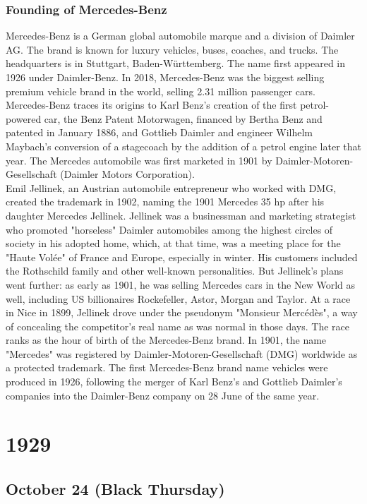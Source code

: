 \documentclass[11pt]{report}
\begin{document}
\subsection{Founding of Mercedes-Benz}
Mercedes-Benz is a German global automobile marque and a division of Daimler AG. The brand is known for luxury vehicles, buses, coaches, and trucks. The headquarters is in Stuttgart, Baden-Württemberg. The name first appeared in 1926 under Daimler-Benz. In 2018, Mercedes-Benz was the biggest selling premium vehicle brand in the world, selling 2.31 million passenger cars.\\ \indent Mercedes-Benz traces its origins to Karl Benz's creation of the first petrol-powered car, the Benz Patent Motorwagen, financed by Bertha Benz and patented in January 1886, and Gottlieb Daimler and engineer Wilhelm Maybach's conversion of a stagecoach by the addition of a petrol engine later that year. The Mercedes automobile was first marketed in 1901 by Daimler-Motoren-Gesellschaft (Daimler Motors Corporation).\\ \indent Emil Jellinek, an Austrian automobile entrepreneur who worked with DMG, created the trademark in 1902, naming the 1901 Mercedes 35 hp after his daughter Mercedes Jellinek. Jellinek was a businessman and marketing strategist who promoted "horseless" Daimler automobiles among the highest circles of society in his adopted home, which, at that time, was a meeting place for the "Haute Volée" of France and Europe, especially in winter. His customers included the Rothschild family and other well-known personalities. But Jellinek's plans went further: as early as 1901, he was selling Mercedes cars in the New World as well, including US billionaires Rockefeller, Astor, Morgan and Taylor. At a race in Nice in 1899, Jellinek drove under the pseudonym "Monsieur Mercédès", a way of concealing the competitor's real name as was normal in those days. The race ranks as the hour of birth of the Mercedes-Benz brand. In 1901, the name "Mercedes" was registered by Daimler-Motoren-Gesellschaft (DMG) worldwide as a protected trademark. The first Mercedes-Benz brand name vehicles were produced in 1926, following the merger of Karl Benz's and Gottlieb Daimler's companies into the Daimler-Benz company on 28 June of the same year.

\chapter{1929}
\section{October 24 (Black Thursday)}
\end{document}
